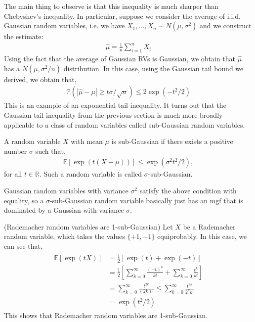 The main thing to observe is that this inequality is much sharper than Chebyshev's inequality. In particular, suppose we consider the average of i.i.d. Gaussian random variables, i.e. we have $X_1, \ldots, X_n \sim N\left(\mu, \sigma^2\right)$ and we construct the estimate:
\begin{align*}
\widehat{\mu}=\frac{1}{n} \sum_{i=1}^n X_i
\end{align*}
Using the fact that the average of Gaussian RVs is Gaussian, we obtain that $\widehat{\mu}$ has a $N\left(\mu, \sigma^2 / n\right)$ distribution. In this case, using the Gaussian tail bound we derived, we obtain that,
\begin{align*}
\mathbb{P}(|\widehat{\mu}-\mu| \geq t \sigma / \sqrt{n}) \leq 2 \exp \left(-t^2 / 2\right)
\end{align*}
This is an example of an exponential tail inequality. It turns out that the Gaussian tail inequality from the previous section is much more broadly applicable to a class of random variables called sub-Gaussian random variables. 

\begin{de}
    A random variable $X$ with mean $\mu$ is sub-Gaussian if there exists a positive number $\sigma$ such that,
\begin{align*}
\mathbb{E}[\exp (t(X-\mu))] \leq \exp \left(\sigma^2 t^2 / 2\right),
\end{align*}
for all $t \in \mathbb{R}$. Such a random variable is called $\sigma$-sub-Gaussian.
\end{de}
\begin{remark}
    Gaussian random variables with variance $\sigma^2$ satisfy the above condition with equality, so a $\sigma$-sub-Gaussian random variable basically just has an mgf that is dominated by a Gaussian with variance $\sigma$.
\end{remark}

\begin{eg}
    (Rademacher random variables are 1-sub-Gaussian) Let $X$ be a Rademacher random variable, which takes the values $\{+1,-1\}$ equiprobably. In this case, we can see that,
\begin{align*}
\begin{aligned}
\mathbb{E}[\exp (t X)] & =\frac{1}{2}[\exp (t)+\exp (-t)] \\
& =\frac{1}{2}\left[\sum_{k=0}^{\infty} \frac{(-t)^k}{k!}+\sum_{k=0}^{\infty} \frac{t^k}{k!}\right] \\
& =\sum_{k=0}^{\infty} \frac{t^{2 k}}{(2 k)!} \leq \sum_{k=0}^{\infty} \frac{t^{2 k}}{2^k k!} \\
& =\exp \left(t^2 / 2\right)
\end{aligned}
\end{align*}
This shows that Rademacher random variables are 1-sub-Gaussian.
\end{eg}

